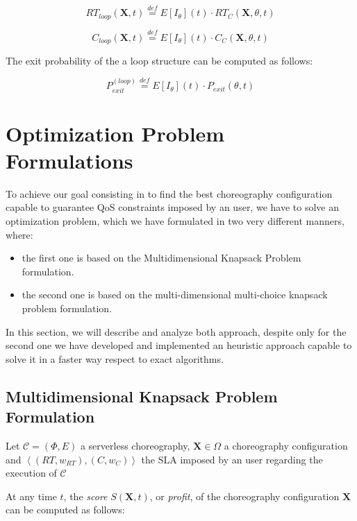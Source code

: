 \documentclass[12pt,a4paper]{report}
\newcommand{\mathDef}{\overset{\textit{def}}{=}}
\begin{document}
\begin{equation}
	RT_{loop}(\textbf{X}, t) \mathDef E[I_{\theta}](t) \cdot  RT_C(\textbf{X}, \theta, t)
\end{equation}

\begin{equation}
	C_{loop}(\textbf{X}, t) \mathDef E[I_{\theta}](t) \cdot C_C(\textbf{X}, \theta, t)
\end{equation}

The exit probability of the a loop structure can be computed as follows:

\begin{equation}
	P_{exit}^{(loop)} \mathDef E[I_{\theta}](t) \cdot P_{exit}(\theta, t)
\end{equation}

\section{Optimization Problem Formulations}

To achieve our goal consisting in to find the best choreography configuration capable to guarantee QoS constraints imposed by an user, we have to solve an optimization problem, which we have formulated in two very different manners, where:

\begin{itemize}
	\item the first one is based on the Multidimensional Knapsack Problem formulation.
	\item the second one is based on the multi-dimensional multi-choice knapsack problem formulation. 
\end{itemize}

In this section, we will describe and analyze both approach, despite only for the second one we have developed and implemented an heuristic approach capable to solve it in a faster way respect to exact algorithms. 

\subsection{Multidimensional Knapsack Problem Formulation}

Let $\mathcal{C} = (\Phi,E)$ a serverless choreography, $\textbf{X} \in \Omega$ a choreography configuration and $\left\langle (RT,w_{RT}),(C,w_{C}) \right\rangle$ the SLA imposed by an user regarding the execution of $\mathcal{C}$

At any time $t$, the \textit{score} $S(\textbf{X},t)$, or \textit{profit}, of the choreography configuration $\textbf{X}$ can be computed as follows:
\end{document}

